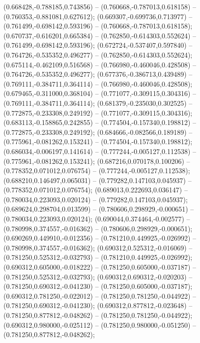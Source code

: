  (0.668428,-0.788185,0.743856) -- (0.760668,-0.787013,0.618158) -- (0.760353,-0.881081,0.627612);
 (0.669307,-0.699736,0.713977) -- (0.761499,-0.698142,0.593196) -- (0.760668,-0.787013,0.618158);
 (0.670737,-0.616201,0.665384) -- (0.762850,-0.614303,0.552624) -- (0.761499,-0.698142,0.593196);
 (0.672724,-0.537407,0.597840) -- (0.764726,-0.535352,0.496277) -- (0.762850,-0.614303,0.552624);
 (0.675114,-0.462109,0.516568) -- (0.766980,-0.460046,0.428508) -- (0.764726,-0.535352,0.496277);
 (0.677376,-0.386713,0.439489) -- (0.769111,-0.384711,0.364114) -- (0.766980,-0.460046,0.428508);
 (0.679465,-0.311000,0.368104) -- (0.771077,-0.309115,0.304316) -- (0.769111,-0.384711,0.364114);
 (0.681379,-0.235030,0.302525) -- (0.772875,-0.233308,0.249192) -- (0.771077,-0.309115,0.304316);
 (0.683113,-0.158865,0.242855) -- (0.774504,-0.157340,0.198812) -- (0.772875,-0.233308,0.249192);
 (0.684666,-0.082566,0.189189) -- (0.775961,-0.081262,0.153241) -- (0.774504,-0.157340,0.198812);
 (0.686034,-0.006197,0.141614) -- (0.777244,-0.005127,0.112538) -- (0.775961,-0.081262,0.153241);
 (0.687216,0.070178,0.100206) -- (0.778352,0.071012,0.076754) -- (0.777244,-0.005127,0.112538);
 (0.688210,0.146497,0.065031) -- (0.779282,0.147103,0.045937) -- (0.778352,0.071012,0.076754);
 (0.689013,0.222693,0.036147) -- (0.780034,0.223093,0.020124) -- (0.779282,0.147103,0.045937);
 (0.689624,0.298704,0.013599) -- (0.780606,0.298929,-0.000651) -- (0.780034,0.223093,0.020124);
 (0.690044,0.374464,-0.002577) -- (0.780998,0.374557,-0.016362) -- (0.780606,0.298929,-0.000651);
 (0.690269,0.449910,-0.012356) -- (0.781210,0.449925,-0.026992) -- (0.780998,0.374557,-0.016362);
 (0.690312,0.525312,-0.016069) -- (0.781250,0.525312,-0.032793) -- (0.781210,0.449925,-0.026992);
 (0.690312,0.605000,-0.018222) -- (0.781250,0.605000,-0.037187) -- (0.781250,0.525312,-0.032793);
 (0.690312,0.690312,-0.020203) -- (0.781250,0.690312,-0.041230) -- (0.781250,0.605000,-0.037187);
 (0.690312,0.781250,-0.022012) -- (0.781250,0.781250,-0.044922) -- (0.781250,0.690312,-0.041230);
 (0.690312,0.877812,-0.023648) -- (0.781250,0.877812,-0.048262) -- (0.781250,0.781250,-0.044922);
 (0.690312,0.980000,-0.025112) -- (0.781250,0.980000,-0.051250) -- (0.781250,0.877812,-0.048262);
